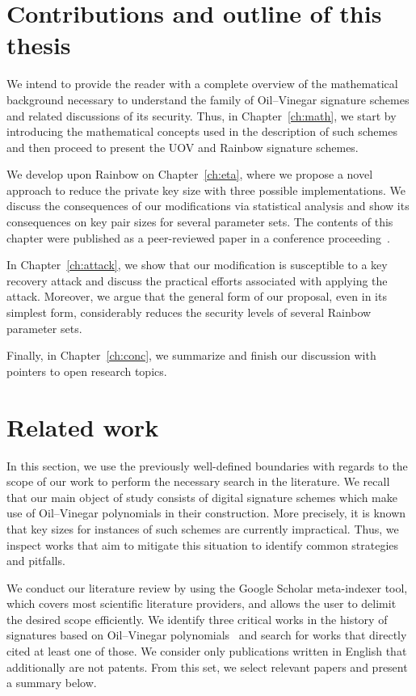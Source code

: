 \documentclass[english]{ufsc-thesis-rn46-2019/ufsc-thesis-rn46-2019}
\theoremstyle{definition}
\begin{document}
\section{Contributions and outline of this thesis}

We intend to provide the reader with a complete overview of the mathematical
background necessary to understand the family of Oil--Vinegar signature schemes
and related discussions of its security. Thus, in Chapter~\ref{ch:math}, we
start by introducing the mathematical concepts used in the description of such
schemes and then proceed to present the UOV and Rainbow signature schemes.

We develop upon Rainbow on Chapter~\ref{ch:eta}, where we propose a novel
approach to reduce the private key size with three possible implementations. We
discuss the consequences of our modifications via statistical analysis and show
its consequences on key pair sizes for several parameter sets. The contents of
this chapter were published as a peer-reviewed paper in a conference
proceeding~\cite{Zambonin:201907}.

In Chapter~\ref{ch:attack}, we show that our modification is susceptible to
a key recovery attack and discuss the practical efforts associated with
applying the attack. Moreover, we argue that the general form of our proposal,
even in its simplest form, considerably reduces the security levels of several
Rainbow parameter sets.

Finally, in Chapter~\ref{ch:conc}, we summarize and finish our discussion with
pointers to open research topics.

\section{Related work}\label{sec:related}

In this section, we use the previously well-defined boundaries with regards to
the scope of our work to perform the necessary search in the literature. We
recall that our main object of study consists of digital signature schemes
which make use of Oil--Vinegar polynomials in their construction. More
precisely, it is known that key sizes for instances of such schemes are
currently impractical. Thus, we inspect works that aim to mitigate this
situation to identify common strategies and pitfalls.

We conduct our literature review by using the Google Scholar meta-indexer tool,
which covers most scientific literature providers, and allows the user to
delimit the desired scope efficiently. We identify three critical works in the
history of signatures based on Oil--Vinegar
polynomials~\cite{Patarin:199709,Kipnis:199904,Ding:200506} and search for
works that directly cited at least one of those. We consider only publications
written in English that additionally are not patents. From this set, we select
relevant papers and present a summary below.
\end{document}
